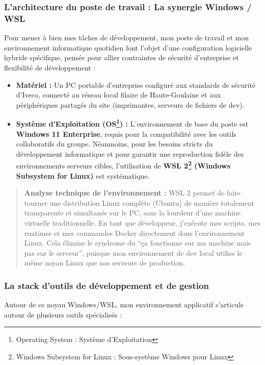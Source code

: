 \subsubsection{L'architecture du poste de travail : La synergie Windows / WSL}

Pour mener à bien mes tâches de développement, mon poste de travail et mon environnement informatique quotidien font l'objet d'une configuration logicielle hybride spécifique, pensée pour allier contraintes de sécurité d'entreprise et flexibilité de développement :

\begin{itemize}[label=\textbullet]
    \item \textbf{Matériel :} Un PC portable d'entreprise configuré aux standards de sécurité d'Iveco, connecté au réseau local filaire de Haute-Goulaine et aux périphériques partagés du site (imprimantes, serveurs de fichiers de dev).
    \item \textbf{Système d'Exploitation (OS\footnote{Operating System : Système d'Exploitation}) :} L'environnement de base du poste est \textbf{Windows 11 Enterprise}, requis pour la compatibilité avec les outils collaboratifs du groupe. Néanmoins, pour les besoins stricts du développement informatique et pour garantir une reproduction fidèle des environnements serveurs cibles, l'utilisation de \textbf{WSL 2\footnote{Windows Subsystem for Linux : Sous-système Windows pour Linux} (Windows Subsystem for Linux)} est systématique.
\end{itemize}

\begin{quote}
\textbf{Analyse technique de l'environnement :} WSL 2 permet de faire tourner une distribution Linux complète (Ubuntu) de manière totalement transparente et simultanée sur le PC, sans la lourdeur d'une machine virtuelle traditionnelle. En tant que développeur, j'exécute mes scripts, mes runtimes et mes commandes Docker directement dans l'environnement Linux. Cela élimine le syndrome du \enquote{ça fonctionne sur ma machine mais pas sur le serveur}, puisque mon environnement de dev local utilise le même noyau Linux que nos serveurs de production.
\end{quote}

\subsubsection{La stack d'outils de développement et de gestion}

Autour de ce noyau Windows/WSL, mon environnement applicatif s'articule autour de plusieurs outils spécialisés :

